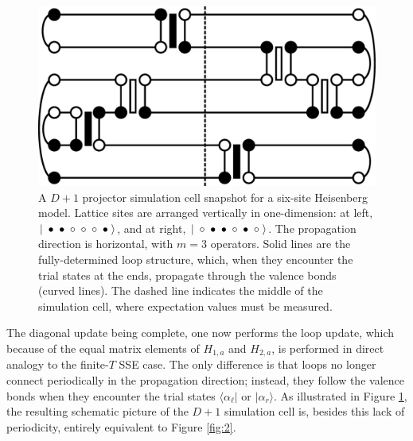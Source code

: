 \documentclass[vecphys]{svmult}
\begin{document}
\begin{figure}[t]
\centering
\includegraphics*[width=.85\textwidth]{zeroT_heis.eps}
\caption[]{ A $D+1$ projector simulation cell snapshot for a six-site Heisenberg model.  Lattice sites are arranged vertically in one-dimension: 
at left, $ |  \hspace{1mm} \bullet  \hspace{1mm} \bullet  \hspace{1mm} \circ  \hspace{1mm} \circ  \hspace{1mm} \circ  \hspace{1mm} \bullet  \hspace{1mm} \rangle$, and at right,  $ |  \hspace{1mm} \circ  \hspace{1mm} \bullet  \hspace{1mm} \bullet  \hspace{1mm} \circ  \hspace{1mm} \bullet  \hspace{1mm} \circ \hspace{1mm}  \rangle$.
The propagation direction is horizontal, with $m=3$ operators.  Solid lines are the fully-determined loop structure, which, when they encounter the trial states at the ends, propagate through the valence bonds (curved lines).  The dashed line indicates the middle of the simulation cell, where expectation values must be measured.}
\label{fig:3}       %
\end{figure} 

The diagonal update being complete, one now performs the loop update, which because of the equal matrix elements of $H_{1,a}$ and $H_{2,a}$, is performed in direct analogy to the finite-$T$ SSE case.  The only difference is that loops no longer connect periodically in the propagation direction; instead, they follow the valence bonds when they encounter the trial states $\langle \alpha_{\ell} |$ or $| \alpha_r \rangle$.  As illustrated in Figure \ref{fig:3}, the resulting schematic picture of the $D+1$ simulation cell is, besides this lack of periodicity, entirely equivalent to Figure \ref{fig:2}.
\end{document}

